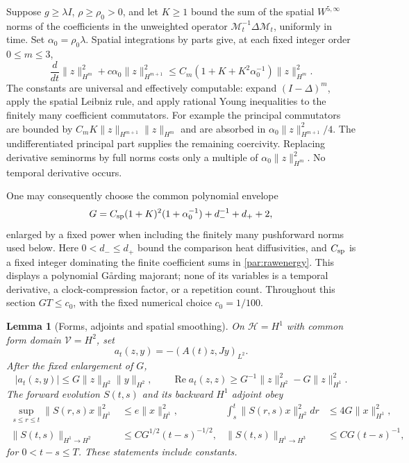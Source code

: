 \documentclass[11pt,a4paper]{amsart}
\newtheorem{lemma}[theorem]{Lemma}
\theoremstyle{definition}
\theoremstyle{remark}
\numberwithin{equation}{section}
\begin{document}
Suppose $g\ge\lambda I$, $\rho\ge\rho_0>0$, and let $K\ge1$ bound the sum
of the spatial $W^{5,\infty}$ norms of the coefficients in the unweighted
operator $\mathcal M_t^{-1}\Delta\mathcal M_t$, uniformly in time. Set
$\alpha_0=\rho_0\lambda$. Spatial integrations by parts give, at each fixed
integer order $0\le m\le3$,
\begin{equation}\label{par:rawenergy}
 \frac d{dt}\|z\|_{H^m}^2+
 c\alpha_0\|z\|_{H^{m+1}}^2
 \le C_m(1+K+K^2\alpha_0^{-1})\|z\|_{H^m}^2.
\end{equation}
The constants are universal and effectively computable: expand
$(I-\Delta)^m$, apply the spatial Leibniz rule, and apply rational Young
inequalities to the finitely many coefficient commutators. For example the
principal commutators are bounded by
$C_mK\|z\|_{H^{m+1}}\|z\|_{H^m}$ and are absorbed in
$\alpha_0\|z\|_{H^{m+1}}^2/4$. The undifferentiated principal part supplies
the remaining coercivity. Replacing derivative seminorms by full norms costs
only a multiple of $\alpha_0\|z\|_{H^m}^2$. No temporal derivative occurs.

One may consequently choose the common polynomial envelope
\begin{equation}\label{par:G}
 G=C_{\rm sp}(1+K)^2(1+\alpha_0^{-1})+d_-^{-1}+d_++2,
\end{equation}
enlarged by a fixed power when including the finitely many pushforward norms
used below. Here $0<d_-\le d_+$ bound the comparison heat diffusivities, and
$C_{\rm sp}$ is a fixed integer dominating the finite coefficient sums in
\eqref{par:rawenergy}. This displays a polynomial G\aa rding majorant; none
of its variables is a temporal derivative, a clock-compression factor, or a
repetition count. Throughout this section $GT\le c_0$, with the fixed numerical choice $c_0=1/100$.

\begin{lemma}[Forms, adjoints and spatial smoothing]\label{par:energy}
On $\mathscr H=H^1$ with common form domain $\mathscr V=H^2$, set
\[
 a_t(z,y)=-(A(t)z,Jy)_{L^2}.
\]
After the fixed enlargement of $G$,
\begin{equation}\label{par:formbounds}
 |a_t(z,y)|\le G\|z\|_{H^2}\|y\|_{H^2},\qquad
 \operatorname{Re}a_t(z,z)\ge
 G^{-1}\|z\|_{H^2}^2-G\|z\|_{H^1}^2.
\end{equation}
The forward evolution $S(t,s)$ and its backward $H^1$ adjoint obey
\begin{align}
 \sup_{s\le r\le t}\|S(r,s)x\|_{H^1}^2&\le e\|x\|_{H^1}^2,
 &\int_s^t\|S(r,s)x\|_{H^2}^2dr&\le4G\|x\|_{H^1}^2,
 \label{par:integrated}\\
 \|S(t,s)\|_{H^1\to H^2}&\le CG^{1/2}(t-s)^{-1/2},
 &\|S(t,s)\|_{H^1\to H^3}&\le CG(t-s)^{-1},
 \label{par:smoothing}
\end{align}
for $0<t-s\le T$. These statements include constants.
\end{lemma}
\end{document}
